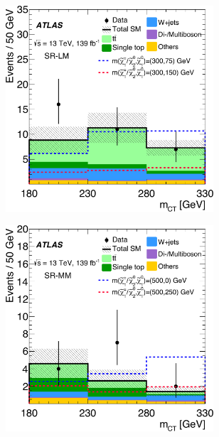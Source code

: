 



 \begin{figure}
	\centering
	\begin{subfigure}[b]{0.5\linewidth}
		\centering\includegraphics[width=0.85\textwidth]{fig_05a_yellow}
	\end{subfigure}\hfill
	\begin{subfigure}[b]{0.5\linewidth}
		\centering\includegraphics[width=0.85\textwidth]{fig_05b_yellow}

\end{subfigure}
\end{figure}
